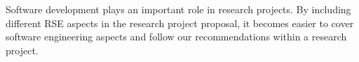 \par 
Software development plays an important role in research projects. By including different \ac{RSE} aspects in the research project proposal, it becomes easier to cover software engineering aspects and follow our recommendations within a research project.


